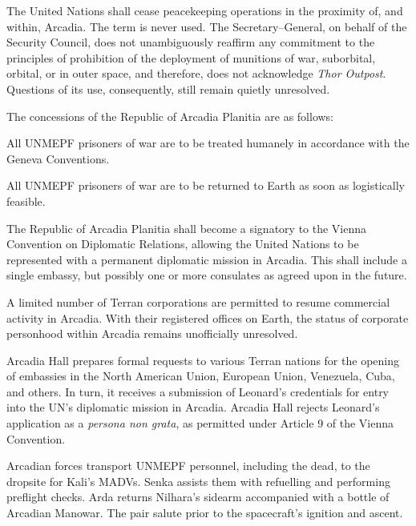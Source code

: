 \item The United Nations shall cease peacekeeping operations in the proximity of, and within, Arcadia. The term  is never used. The Secretary--General, on behalf of the Security Council, does not unambiguously reaffirm any commitment to the principles of prohibition of the deployment of munitions of war, suborbital, orbital, or in outer space, and therefore, does not acknowledge {\it Thor Outpost}. Questions of its use, consequently, still remain quietly unresolved.
\stopitemize

The concessions of the Republic of Arcadia Planitia are as follows:

\startitemize[R]
\item All UNMEPF prisoners of war are to be treated humanely in accordance with the Geneva Conventions.

\item All UNMEPF prisoners of war are to be returned to Earth as soon as logistically feasible.

\item The Republic of Arcadia Planitia shall become a signatory to the Vienna Convention on Diplomatic Relations, allowing the United Nations to be represented with a permanent diplomatic mission in Arcadia. This shall include a single embassy, but possibly one or more consulates as agreed upon in the future.

\item A limited number of Terran corporations are permitted to resume commercial activity in Arcadia. With their registered offices on Earth, the status of corporate personhood within Arcadia remains unofficially unresolved.
\stopitemize

Arcadia Hall prepares formal requests to various Terran nations for the opening of embassies in the North American Union, European Union, Venezuela, Cuba, and others. In turn, it receives a submission of Leonard's credentials for entry into the UN's diplomatic mission in Arcadia. Arcadia Hall rejects Leonard's application as a {\it persona non grata}, as permitted under Article 9 of the Vienna Convention.
\StopTimelineDate

Arcadian forces transport UNMEPF personnel, including the dead, to the dropsite for Kali's MADVs. Senka assists them with refuelling and performing preflight checks. Arda returns Nilhara's sidearm accompanied with a bottle of Arcadian Manowar. The pair salute prior to the spacecraft's ignition and ascent.
\StopTimelineDate


